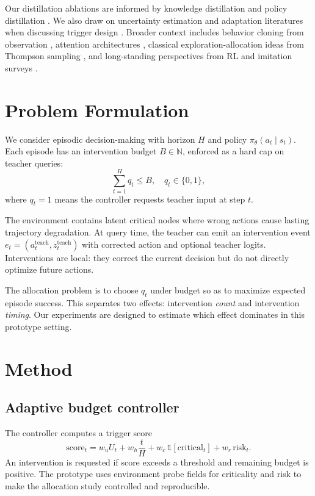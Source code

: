 \documentclass{article}
\begin{document}
Our distillation ablations are informed by knowledge distillation and policy distillation \citep{hinton2015distilling,rusu2015policy,rusu2016sim2real}. We also draw on uncertainty estimation and adaptation literatures when discussing trigger design \citep{kendall2017uncertainty,finn2017maml,chua2018pets,mandlekar2021mime}. Broader context includes behavior cloning from observation \citep{torabi2018bco}, attention architectures \citep{vaswani2017attention}, classical exploration-allocation ideas from Thompson sampling \citep{thompson1933}, and long-standing perspectives from RL and imitation surveys \citep{argall2009survey,osa2018algorithmic,silver2016alphago,haarnoja2018sac,lillicrap2016ddpg}.

\section{Problem Formulation}
We consider episodic decision-making with horizon $H$ and policy $\pi_\theta(a_t\mid s_t)$. Each episode has an intervention budget $B\in\mathbb{N}$, enforced as a hard cap on teacher queries:
\begin{equation}
\sum_{t=1}^{H} q_t \le B, \quad q_t\in\{0,1\},
\end{equation}
where $q_t=1$ means the controller requests teacher input at step $t$.

The environment contains latent critical nodes where wrong actions cause lasting trajectory degradation. At query time, the teacher can emit an intervention event $e_t=(a_t^{\text{teach}}, z_t^{\text{teach}})$ with corrected action and optional teacher logits. Interventions are local: they correct the current decision but do not directly optimize future actions.

The allocation problem is to choose $q_t$ under budget so as to maximize expected episode success. This separates two effects: intervention \emph{count} and intervention \emph{timing}. Our experiments are designed to estimate which effect dominates in this prototype setting.

\section{Method}
\subsection{Adaptive budget controller}
The controller computes a trigger score
\begin{equation}
\text{score}_t = w_u U_t + w_h \frac{t}{H} + w_c\,\mathbb{1}[\text{critical}_t] + w_r\,\text{risk}_t.
\end{equation}
An intervention is requested if score exceeds a threshold and remaining budget is positive. The prototype uses environment probe fields for criticality and risk to make the allocation study controlled and reproducible.
\end{document}
